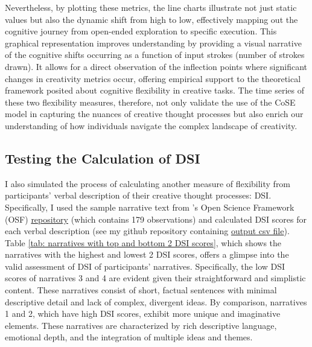 \documentclass[../Proposal.tex]{subfiles}
\begin{document}
Nevertheless, by plotting these metrics, the line charts illustrate not just static values but also the dynamic shift from high to low, effectively mapping out the cognitive journey from open-ended exploration to specific execution. This graphical representation improves understanding by providing a visual narrative of the cognitive shifts occurring as a function of input strokes (number of strokes drawn). It allows for a direct observation of the inflection points where significant changes in creativity metrics occur, offering empirical support to the theoretical framework posited about cognitive flexibility in creative tasks. The time series of these two flexibility measures, therefore, not only validate the use of the CoSE model in capturing the nuances of creative thought processes but also enrich our understanding of how individuals navigate the complex landscape of creativity.

\subsection*{Testing the Calculation of DSI}
I also simulated the process of calculating another measure of flexibility from participants' verbal description of their creative thought processes: DSI. Specifically, I used the sample narrative text from \textcite{johnson_divergent_2022}'s Open Science Framework (OSF) \href{https://osf.io/ath2s/}{repository} (which contains 179 observations) and calculated DSI scores for each verbal description (see my github repository containing \href{https://github.com/cty20010831/UChicago_MA_Thesis_Divergent-Semantic-Integration/blob/bdd32706afb7ba8e72f07b3b10d1eaa9fe8b4331/user_text/DSI_output.csv.csv}{output csv file}). Table \ref{tab: narratives with top and bottom 2 DSI scores}, which shows the narratives with the highest and lowest 2 DSI scores, offers a glimpse into the valid assessment of DSI of participants' narratives. Specifically, the low DSI scores of narratives 3 and 4 are evident given their straightforward and simplistic content. These narratives consist of short, factual sentences with minimal descriptive detail and lack of complex, divergent ideas. By comparison, narratives 1 and 2, which have high DSI scores, exhibit more unique and imaginative elements. These narratives are characterized by rich descriptive language, emotional depth, and the integration of multiple ideas and themes. 
\end{document}
